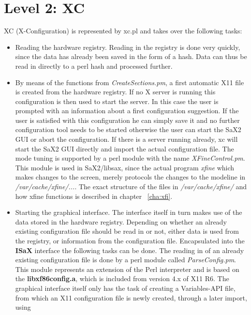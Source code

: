 \section{Level 2: XC}
\label{sec:le2}
XC (X-Configuration) is represented by xc.pl and 
takes over the following tasks:
\begin{itemize}
\item Reading the hardware registry. Reading in the registry is done very
      quickly, since the data has already been saved in the form of a hash. Data
      can thus be read in directly to a perl hash and processed further. 
\item By means of the functions from \textit{CreateSections.pm}, 
      a first automatic X11 file is created from the hardware registry. If 
      no X server is running this configuration is then used to start the
      server. In this case the user is prompted with an information about
      a first configuration suggestion. If the user is satisfied with
      this configuration he can simply save it and no further configuration
      tool needs to be started otherwise the user can start the SaX2 GUI or
      abort the configuration. If there is a server running already,
      xc will start the SaX2 GUI directly and import the actual configuration
	  file. The mode tuning is supported by a perl module with the name
      \textit{XFineControl.pm}. This module is used in SaX2/libsax, since the
      actual program \textit{xfine} which makes changes to the screen,
      merely protocols the changes to the modeline in
	  \textit{/var/cache/xfine/...}. The exact structure of the files
      in \textit{/var/cache/xfine/} and how xfine functions is described
      in chapter ~\ref{cha:xfi}.
\item Starting the graphical interface. The interface itself in turn makes use
      of the data stored in the hardware registry.
      Depending on whether an already existing configuration file should be
      read in or not, either data is used from the registry, or information
      from the configuration file. Encapsulated into the \textbf{ISaX}
      interface the following tasks can be done. The reading in of an already
      existing configuration file is done by a perl module called
      \textit{ParseConfig.pm}. This module represents an extension of the 
      Perl interpreter and is based on the \textbf{libxf86config.a}, which is
      included from version 4.x of X11 R6. The graphical interface itself
      only has the task of creating a Variables-API file, from which an
      X11 configuration file is newly created, through a later import, using

\end{itemize}
